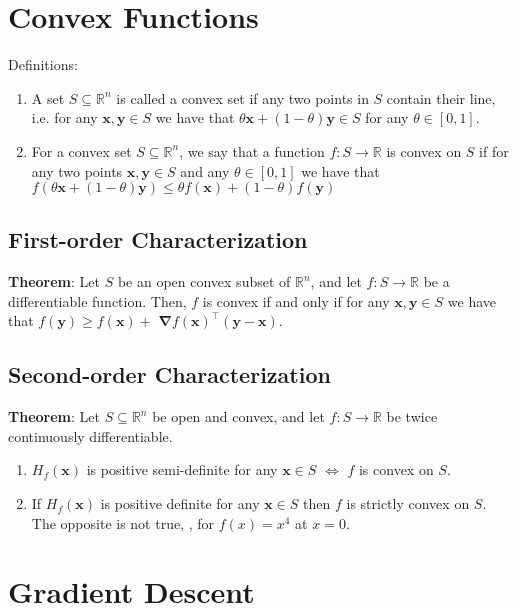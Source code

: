\section{Convex Functions}

Definitions:
\begin{enumerate}
    \item  A set $S \subseteq \mathbb{R}^{n}$ is called a convex set if any two points in $S$ contain their line, i.e. for any $\boldsymbol{x}, \boldsymbol{y} \in S$ we have that $\theta \boldsymbol{x}+(1-\theta) \boldsymbol{y} \in S$ for any $\theta \in[0,1]$.
    \item For a convex set $S \subseteq \mathbb{R}^{n}$, we say that a function $f: S \rightarrow \mathbb{R}$ is convex on $S$ if for any two points $\boldsymbol{x}, \boldsymbol{y} \in S$ and any $\theta \in[0,1]$ we have that
    $
    f(\theta \boldsymbol{x}+(1-\theta) \boldsymbol{y}) \leq \theta f(\boldsymbol{x})+(1-\theta) f(\boldsymbol{y})
    $
\end{enumerate}


\subsection{First-order Characterization}
\textbf{Theorem}:
Let $S$ be an open convex subset of $\mathbb{R}^{n}$, and let $f: S \rightarrow \mathbb{R}$ be a differentiable function. Then, $f$ is convex if and only if for any $\boldsymbol{x}, \boldsymbol{y} \in S$ we have that $f(\boldsymbol{y}) \geq f(\boldsymbol{x})+$ $\boldsymbol{\nabla} f(\boldsymbol{x})^{\top}(\boldsymbol{y}-\boldsymbol{x}) .$

\subsection{Second-order Characterization}
\textbf{Theorem}:
Let $S \subseteq \mathbb{R}^{n}$ be open and convex, and let $f: S \rightarrow \mathbb{R}$ be twice continuously differentiable.
\begin{enumerate}
    \item $H_{f}(\boldsymbol{x})$ is positive semi-definite for any $\boldsymbol{x} \in S$ $\Leftrightarrow$ $f$ is convex on $S$.
    \item If $H_{f}(\boldsymbol{x})$ is positive definite for any $\boldsymbol{x} \in S$ then $f$ is strictly convex on $S$. The opposite is not true, \eg, for $f(x)=x^4$ at $x=0$.
\end{enumerate}

\section{Gradient Descent}

